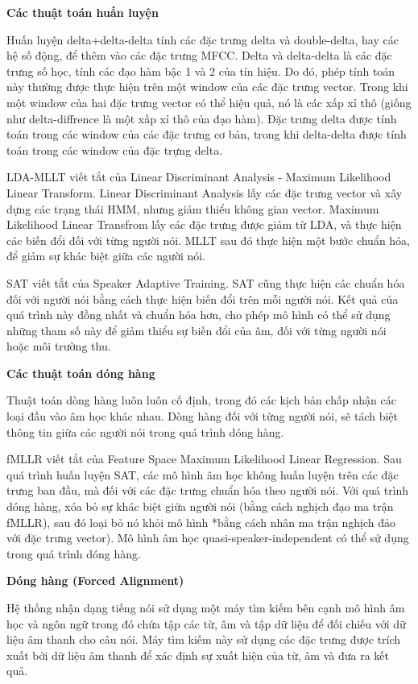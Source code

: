 \textbf{Các thuật toán huấn luyện}

Huấn luyện delta+delta-delta tính các đặc trưng delta và double-delta, hay các hệ số động, để thêm vào các đặc trưng MFCC. Delta và delta-delta là các đặc trưng số học, tính các đạo hàm bậc 1 và 2 của tín hiệu. Do đó, phép tính toán này thường được thực hiện trên một window của các đặc trưng vector. Trong khi một window của hai đặc trưng vector có thể hiệu quả, nó là các xấp xỉ thô (giống như delta-diffrence là một xấp xỉ thô của đạo hàm). Đặc trưng delta được tính toán trong các window của các đặc trưng cơ bản, trong khi delta-delta được tính toán trong các window của đặc trựng delta.

LDA-MLLT viết tắt của Linear Discriminant Analysis - Maximum Likelihood Linear Transform. Linear Discriminant Analysis lấy các đặc trưng vector và xây dựng các trạng thái HMM, nhưng giảm thiểu không gian vector. Maximum Likelihood Linear Transfrom lấy các đặc trưng được giảm từ LDA, và thực hiện các biến đổi đối với từng người nói. MLLT sau đó thực hiện một bước chuẩn hóa, để giảm sự khác biệt giữa các người nói.

SAT viết tắt của Speaker Adaptive Training. SAT cũng thực hiện các chuẩn hóa đối với người nói bằng cách thực hiện biến đổi trên mỗi người nói. Kết quả của quá trình này đồng nhất và chuẩn hóa hơn, cho phép mô hình có thể sử dụng những tham số này để giảm thiểu sự biến đổi của âm, đối với từng người nói hoặc môi trường thu.

\textbf{Các thuật toán dóng hàng}

Thuật toán dòng hàng luôn luôn cố định, trong đó các kịch bản chấp nhận các loại đầu vào âm học khác nhau. Dòng hàng đối với từng người nói, sẽ tách biệt thông tin giữa các người nói trong quá trình dóng hàng.

fMLLR viết tắt của Feature Space Maximum Likelihood Linear Regression. Sau quá trình huấn luyện SAT, các mô hình âm học không huấn luyện trên các đặc trưng ban đầu, mà đối với các đặc trưng chuẩn hóa theo người nói. Với quá trình dóng hàng, xóa bỏ sự khác biệt giữa người nói (bằng cách nghịch đạo ma trận fMLLR), sau đó loại bỏ nó khỏi mô hình *bằng cách nhân ma trận nghịch đảo với đặc trưng vector). Mô hình âm học quasi-speaker-independent có thể sử dụng trong quá trình dóng hàng.

\textbf{Dóng hàng (Forced Alignment)}

Hệ thống nhận dạng tiếng nói sử dụng một máy tìm kiếm bên cạnh mô hình âm học và ngôn ngữ trong đó chứa tập các từ, âm và tập dữ liệu để đối chiếu với dữ liệu âm thanh cho câu nói. Máy tìm kiếm này sử dụng các đặc trưng được trích xuất bởi dữ liệu âm thanh để xác định sự xuất hiện của từ, âm và đưa ra kết quả.

